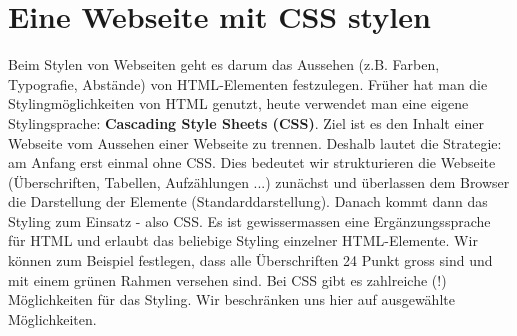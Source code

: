
\toggletrue{image}
\toggletrue{imagehover}

\chapter{Eine Webseite mit \acs{CSS} stylen}
\label{chapter-css}

Beim Stylen von Webseiten geht es darum das Aussehen (z.B. Farben, Typografie, Abstände) von \ac{HTML}-Elementen festzulegen. Früher hat man die Stylingmöglichkeiten von \ac{HTML} genutzt, heute verwendet man eine eigene Stylingsprache: \textbf{Cascading Style Sheets (\ac{CSS})}. Ziel ist es den Inhalt einer Webseite vom Aussehen einer Webseite zu trennen. Deshalb lautet die Strategie: am Anfang erst einmal ohne \ac{CSS}. Dies bedeutet wir strukturieren die Webseite (Überschriften, Tabellen, Aufzählungen ...) zunächst und überlassen dem Browser die Darstellung der Elemente (Standarddarstellung). Danach kommt dann das Styling zum Einsatz - also \ac{CSS}. Es ist gewissermassen eine Ergänzungssprache für \ac{HTML} und erlaubt das beliebige Styling einzelner \ac{HTML}-Elemente. Wir können zum Beispiel festlegen, dass alle Überschriften 24 Punkt gross sind und mit einem grünen Rahmen versehen sind. Bei \ac{CSS} gibt es zahlreiche (!) Möglichkeiten für das Styling. Wir beschränken uns hier auf ausgewählte Möglichkeiten.

\newcommand{\eineWebseiteMitCssStylenLernziele}{
\protect\begin{todolist}
\item Sie erklären an einem Beispiel, wozu man \ac{CSS} verwenden kann.
\item Sie erstellen eine \ac{CSS}-Datei und verknüpfen diese mit einer \ac{HTML}-Datei.
\item Sie definieren eine \ac{CSS}-Klasse und wenden diese Klasse auf ein \ac{HTML}-Element an.
\item Sie wenden ein \ac{CSS}-Framework an.
\end{todolist}
}

